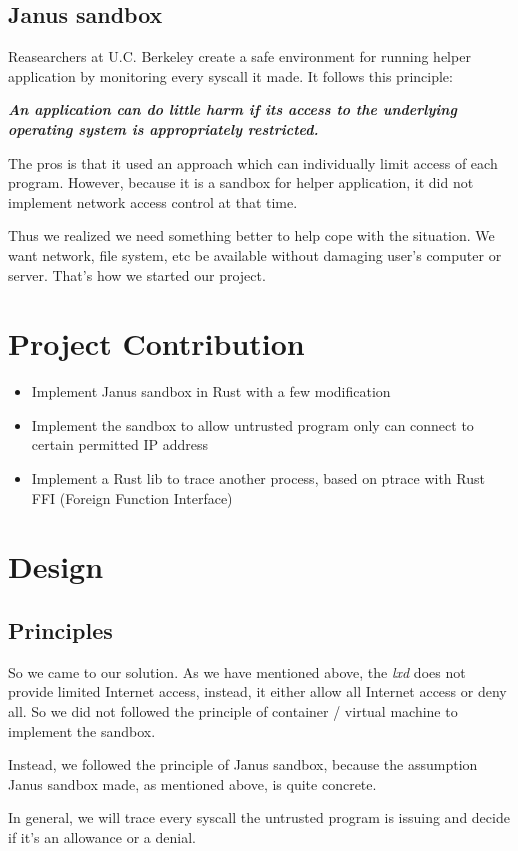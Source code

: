 \documentclass[conference,compsoc]{IEEEtran}
\begin{document}
		\subsection{Janus sandbox}
			\par
				Reasearchers at U.C. Berkeley create a safe environment for running helper application by monitoring every syscall it made. It follows this principle:
				\par
				\emph{\textbf{
					An application can do little harm if its access to the underlying operating system is appropriately restricted.\cite{goldberg1996secure}
				}}
				\par
				The pros is that it used an approach which can individually limit access of each program.
				However, because it is a sandbox for helper application, it did not implement network access control at that time.
		\par
			Thus we realized we need something better to help cope with the situation. 
			We want network, file system, etc be available without damaging user's computer or server. 
			That's how we started our project.
\section {Project Contribution}
\begin{itemize}
	\item{Implement Janus sandbox in Rust with a few modification}
	\item{Implement the sandbox to allow untrusted program only can connect to certain permitted IP address}
	\item{Implement a Rust lib to trace another process, based on ptrace with Rust FFI (Foreign Function Interface)}
\end{itemize}
\section {Design}
	\subsection{Principles}
		\par
			So we came to our solution. As we have mentioned above, the \emph{lxd} does not provide limited Internet access, instead, it either allow all Internet access or deny all. So we did not followed the principle of container / virtual machine to implement the sandbox.
			\par
			Instead, we followed the principle of Janus sandbox, because the assumption Janus sandbox made, as mentioned above, is quite concrete.
			\par
			In general, we will trace every syscall the untrusted program is issuing and decide if it's an allowance or a denial.
\end{document}

